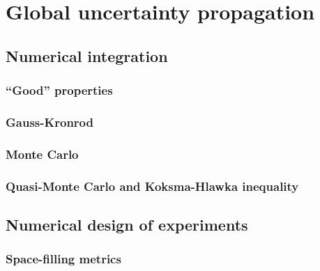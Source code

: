 \section{Global uncertainty propagation}


\subsection{Numerical integration}
\subsubsection{``Good'' properties}

\subsubsection{Gauss-Kronrod}

\subsubsection{Monte Carlo}

\subsubsection{Quasi-Monte Carlo and Koksma-Hlawka inequality}

\subsection{Numerical design of experiments}
\subsubsection{Space-filling metrics}


